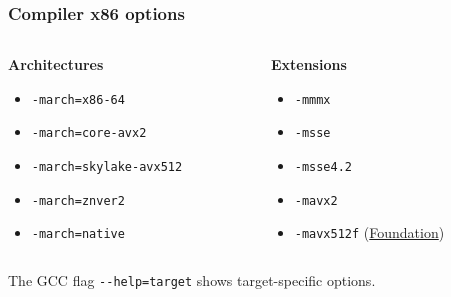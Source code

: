 \documentclass[14pt,aspectratio=169,dvipsnames,table]{beamer}
\begin{document}
\begin{frame}[fragile]
  \frametitle{Compiler x86 options \hfill
    \href{https://gcc.gnu.org/onlinedocs/gcc/x86-Options.html}
    {\large \faQuestionCircle}\;}

  \begin{columns}
    \begin{column}{0.49\textwidth}
      {\bfseries\color{Red} Architectures}
      \begin{itemize}[wide=0pt,itemsep=7pt,topsep=7pt]
      \item \verb#-march=x86-64#
      \item \verb#-march=core-avx2#
      \item \verb#-march=skylake-avx512#
      \item \verb#-march=znver2#
      \item \verb#-march=native#
      \end{itemize}
    \end{column}
    \hfill
    \begin{column}{0.49\textwidth}
      {\bfseries\color{Blue} Extensions}
      \begin{itemize}[wide=0pt,itemsep=7pt,topsep=7pt]
      \item \verb#-mmmx#
      \item \verb#-msse#
      \item \verb#-msse4.2#
      \item \verb#-mavx2#
      \item \verb#-mavx512f#
        (\href{https://en.wikichip.org/wiki/x86/avx-512}{Foundation})
      \end{itemize}
    \end{column}
  \end{columns}

  \vskip 26pt

  The GCC flag \verb#--help=target# shows  target-specific options.
\end{frame}





\end{document}
